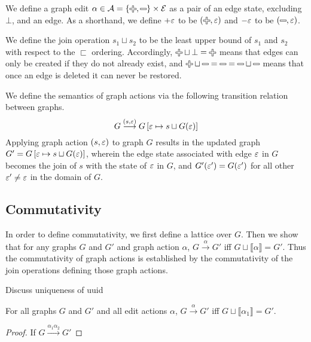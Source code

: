 We define a graph edit $\alpha \in \A = \left\{\Plus, \Minus\right\} \times \E$
as a pair of an edge state, excluding $\bot$, and an edge. As a shorthand, we
define $+\varepsilon$ to be $(\Plus, \e)$ and $-\varepsilon$ to be $(\Minus, \e)$.

We define the join operation $s_1 \sqcup s_2$ to be the least upper bound of
$s_1$ and $s_2$ with respect to the $\sqsubset$ ordering. Accordingly, $\Plus
\sqcup \bot = \Plus$ means that edges can only be created if they do not already
exist, and $\Plus \sqcup \Minus = \Minus = \Minus \sqcup \Minus$ means that once
an edge is deleted it can never be restored.

We define the semantics of graph actions via the following transition relation
between graphs.
\[
  G \overset{(s,\varepsilon)}{\longrightarrow} G\left[ \varepsilon \mapsto s \sqcup G(\varepsilon) \right]
\]
Applying graph action $\left(s, \varepsilon\right)$ to graph $G$ results in the
updated graph $G' = G\left[\varepsilon \mapsto s \sqcup G(\varepsilon) \right]$, wherein the edge
state associated with edge $\varepsilon$ in $G$ becomes the join of $s$ with the state of
$\varepsilon$ in $G$, and $G'(\varepsilon') = G(\varepsilon')$ for all other $\varepsilon' \ne \varepsilon$ in the domain of
$G$.



\subsection{Commutativity}%
\label{sub:Commutativity:formal}

In order to define commutativity, we first define a lattice over $G$.
Then we show that for any graphs $G$ and $G'$ and graph action $\alpha$,
$G \overset{\alpha}\rightarrow G'$
iff $G \sqcup \llbracket\alpha\rrbracket = G'$.
Thus the commutativity of graph actions is established
by the commutativity of the join operations defining those graph actions.

Discuss uniqueness of uuid

\begin{lemma}
  \label{lem:Join Commutativity}
\end{lemma}

\begin{lemma}[Joining]
  \label{lem:Joining}
  For all graphs $G$ and $G'$ and all edit actions $\alpha$,
  $G \overset{\alpha}{\longrightarrow} G'$
  iff $G \sqcup \llbracket\alpha_1\rrbracket = G'$.
\end{lemma}
\begin{proof}
  If $G \overset{\alpha_1\alpha_2}{\longrightarrow} G'$
\end{proof}


